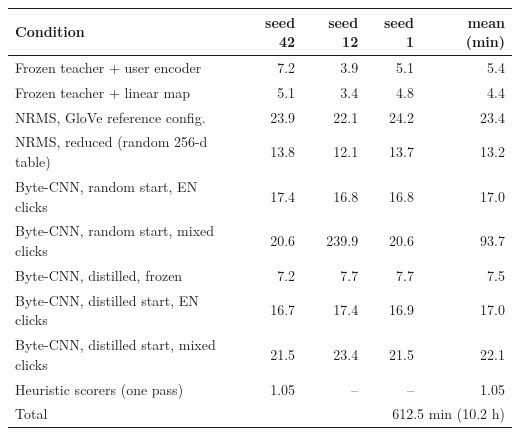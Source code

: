 \begin{tabular}{lrrrr}
\toprule
Condition & seed 42 & seed 12 & seed 1 & mean (min)\\
\midrule
Frozen teacher + user encoder & 7.2 & 3.9 & 5.1 & 5.4\\
Frozen teacher + linear map & 5.1 & 3.4 & 4.8 & 4.4\\
NRMS, GloVe reference config. & 23.9 & 22.1 & 24.2 & 23.4\\
NRMS, reduced (random 256-d table) & 13.8 & 12.1 & 13.7 & 13.2\\
Byte-CNN, random start, EN clicks & 17.4 & 16.8 & 16.8 & 17.0\\
Byte-CNN, random start, mixed clicks & 20.6 & 239.9 & 20.6 & 93.7\\
Byte-CNN, distilled, frozen & 7.2 & 7.7 & 7.7 & 7.5\\
Byte-CNN, distilled start, EN clicks & 16.7 & 17.4 & 16.9 & 17.0\\
Byte-CNN, distilled start, mixed clicks & 21.5 & 23.4 & 21.5 & 22.1\\
Heuristic scorers (one pass) & 1.05 & -- & -- & 1.05\\
\midrule
Total & \multicolumn{4}{r}{612.5 min (10.2 h)}\\
\bottomrule
\end{tabular}
